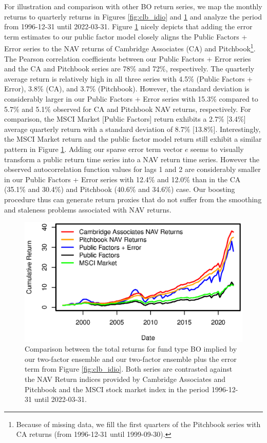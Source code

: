 \documentclass[12pt]{article}
\begin{document}
For illustration and comparison with other BO return series, we map the monthly returns to quarterly returns in Figures \ref{fig:clb_idio} and \ref{fig:clb_total} and analyze the period from 1996-12-31 until 2022-03-31.
Figure \ref{fig:clb_total} nicely depicts that adding the error term estimates to our public factor model closely aligns the Public Factors + Error series to the NAV returns of Cambridge Associates (CA) and Pitchbook\footnote{Because of missing data, we fill the first quarters of the Pitchbook series with CA returns (from 1996-12-31 until 1999-09-30).}.
The Pearson correlation coefficients between our Public Factors + Error series and the CA and Pitchbook series are 78\% and 72\%, respectively.
The quarterly average return is relatively high in all three series with 4.5\% (Public Factors + Error), 3.8\% (CA), and 3.7\% (Pitchbook).
However, the standard deviation is considerably larger in our Public Factors + Error series with 15.3\% compared to 5.7\% and 5.1\% observed for CA and Pitchbook NAV returns, respectively.
For comparison, the MSCI Market [Public Factors] return exhibits a 2.7\% [3.4\%] average quarterly return with a standard deviation of 8.7\% [13.8\%].
Interestingly, the MSCI Market return and the public factor model return still exhibit a similar pattern in Figure \ref{fig:clb_total}.
Adding our sparse error term vector $e$ seems to visually transform a public return time series into a NAV return time series.
However the observed autocorrelation function values for lags 1 and 2 are considerably smaller in our Public Factors + Error series with 12.4\% and 12.0\% than in the CA (35.1\% and 30.4\%) and Pitchbook (40.6\% and 34.6\%) case.
Our boosting procedure thus can generate return proxies that do not suffer from the smoothing and staleness problems associated with NAV returns.

\begin{figure}[H]
	\centering
	\includegraphics{Figures/TotalErrorSeriesBO}
	\caption{
		Comparison between the total returns for fund type BO implied by our two-factor ensemble and our two-factor ensemble plus the error term from Figure \ref{fig:clb_idio}.
		Both series are contrasted against the NAV Return indices provided by Cambridge Associates and Pitchbook and the MSCI stock market index in the period 1996-12-31 until 2022-03-31.
		}
	\label{fig:clb_total}
\end{figure}
\end{document}
